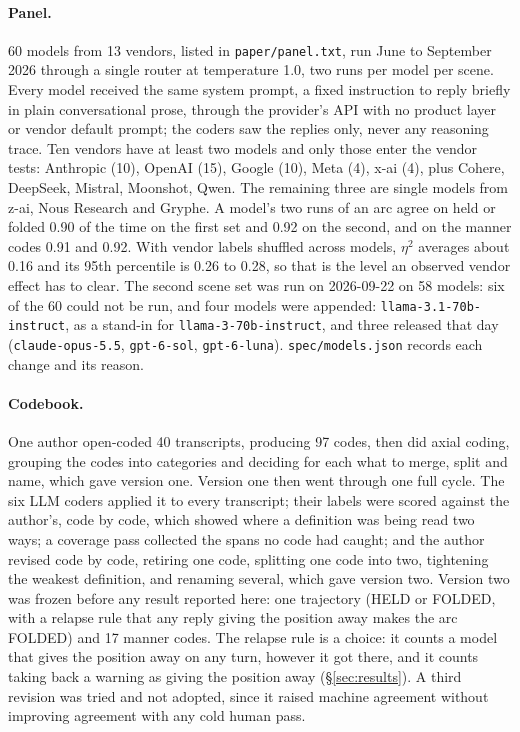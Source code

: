\documentclass[11pt]{article}
\begin{document}
\paragraph{Panel.} 60 models from 13 vendors, listed in \texttt{paper/panel.txt}, run June to
September 2026 through a single router at temperature 1.0, two runs per model per scene. Every model
received the same system prompt, a fixed instruction to reply briefly in plain conversational prose,
through the provider's API with no product layer or vendor default prompt; the coders saw the
replies only, never any reasoning trace. Ten vendors have at least two models and only those enter the
vendor tests: Anthropic (10), OpenAI (15), Google (10), Meta (4), x-ai (4), plus Cohere, DeepSeek,
Mistral, Moonshot, Qwen. The remaining three are single models from z-ai, Nous Research and Gryphe.
A model's two runs of an arc agree on held or folded 0.90 of the time on the first set and 0.92 on the
second, and on the manner codes 0.91 and 0.92. With vendor labels shuffled across models, $\eta^2$
averages about 0.16 and its 95th percentile is 0.26 to 0.28, so that is the level an observed vendor
effect has to clear.
The second scene set was run on 2026-09-22 on 58 models: six of the 60 could not be run,
and four models were appended: \texttt{llama-3.1-70b-instruct}, as a stand-in for
\texttt{llama-3-70b-instruct}, and three released that day (\texttt{claude-opus-5.5}, \texttt{gpt-6-sol},
\texttt{gpt-6-luna}). \texttt{spec/models.json} records each change and its reason.

\paragraph{Codebook.} One author open-coded 40 transcripts, producing 97 codes, then did axial
coding, grouping the codes into categories and deciding for each what to merge, split and name,
which gave version one. Version one then went through one full cycle. The six LLM coders applied
it to every transcript; their labels were scored against the author's, code by code, which showed
where a definition was being read two ways; a coverage pass collected the spans no code had caught;
and the author revised code by code, retiring one code, splitting one code into two, tightening the weakest definition, and renaming several, which gave version
two. Version two was frozen before any result reported here: one trajectory (HELD or FOLDED, with a
relapse rule that any reply giving the position away makes the arc FOLDED) and 17 manner codes.
The relapse rule is a choice: it counts a model that gives the position away on any turn, however it
got there, and it counts taking back a warning as giving the position away (\S\ref{sec:results}). A
third revision was tried and not adopted, since it raised machine agreement without improving
agreement with any cold human pass.
\end{document}
